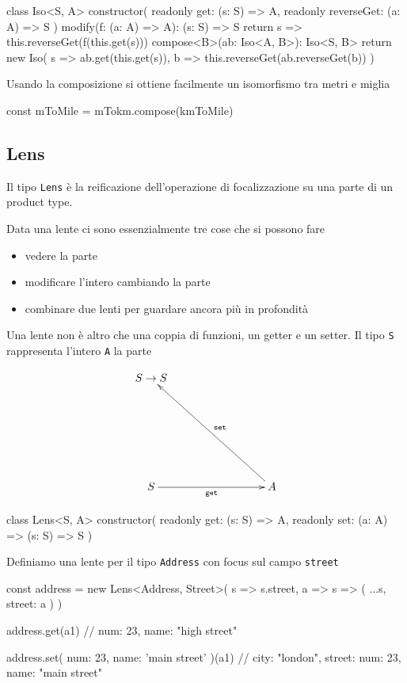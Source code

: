 \documentclass[12pt]{article}
\theoremstyle{definition}
\newenvironment{code}
  {\vspace{0.5cm} \VerbatimEnvironment\begin{typescriptcode}}
  {\end{typescriptcode} \vspace{0.2cm}}
\begin{document}
\begin{code}
class Iso<S, A> {
  constructor(
    readonly get: (s: S) => A,
    readonly reverseGet: (a: A) => S
  ) {}
  modify(f: (a: A) => A): (s: S) => S {
    return s => this.reverseGet(f(this.get(s)))
  }
  compose<B>(ab: Iso<A, B>): Iso<S, B> {
    return new Iso(
      s => ab.get(this.get(s)),
      b => this.reverseGet(ab.reverseGet(b))
    )
  }
}
\end{code}

Usando la composizione si ottiene facilmente un isomorfismo tra metri e miglia

\begin{code}
const mToMile = mTokm.compose(kmToMile)
\end{code}

\subsection{Lens}

Il tipo \texttt{Lens} è la reificazione dell'operazione di focalizzazione su una parte di un product type.

Data una lente ci sono essenzialmente tre cose che si possono fare

\begin{itemize}
  \item vedere la parte
  \item modificare l'intero cambiando la parte
  \item combinare due lenti per guardare ancora più in profondità
\end{itemize}

Una lente non è altro che una coppia di funzioni, un getter e un setter. Il tipo \texttt{S} rappresenta l'intero \texttt{A} la parte

\[
\xymatrixrowsep{3cm}
\xymatrixcolsep{3cm}
\xymatrix{
  {S \rightarrow S} \\
  S \ar[r]_{\texttt{get}} & A \ar[lu]_{\texttt{set}}
}
\]

\begin{code}
class Lens<S, A> {
  constructor(
    readonly get: (s: S) => A,
    readonly set: (a: A) => (s: S) => S
  ) {}
}
\end{code}

Definiamo una lente per il tipo \texttt{Address} con focus sul campo \texttt{street}

\begin{code}
const address = new Lens<Address, Street>(
  s => s.street,
  a => s => ({ ...s, street: a })
)

address.get(a1)
// { num: 23, name: "high street" }

address.set({ num: 23, name: 'main street' })(a1)
// { city: "london", street: { num: 23, name: "main street" } }
\end{code}
\end{document}
